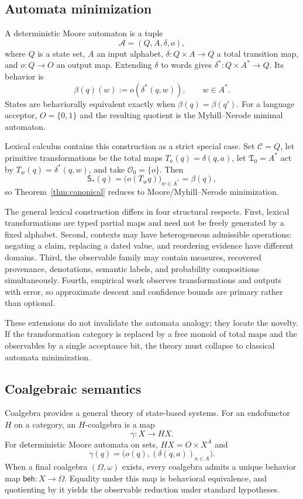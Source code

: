 \documentclass[11pt]{article}
\newcommand{\Ctxt}{\mathcal C}
\newcommand{\Trans}{\mathfrak T}
\begin{document}
{\subsection{Automata minimization}

A deterministic Moore automaton is a tuple
\[
 \mathcal A=(Q,A,\delta,o),
\]
where $Q$ is a state set, $A$ an input alphabet, $\delta:Q\times A\to Q$ a total transition map, and $o:Q\to O$ an output map. Extending $\delta$ to words gives $\delta^*:Q\times A^*\to Q$. Its behavior is
\[
 \beta(q)(w):=o(\delta^*(q,w)),\qquad w\in A^*.
\]
States are behaviorally equivalent exactly when $\beta(q)=\beta(q')$. For a language acceptor, $O=\{0,1\}$ and the resulting quotient is the Myhill--Nerode minimal automaton.

Lexical calculus contains this construction as a strict special case. Set $\Ctxt=Q$, let primitive transformations be the total maps $T_a(q)=\delta(q,a)$, let $\Trans_0=A^*$ act by $T_w(q)=\delta^*(q,w)$, and take $\mathcal O_0=\{o\}$. Then
\[
 \mathsf S_*(q)=\bigl(o(T_wq)\bigr)_{w\in A^*}=\beta(q),
\]
so Theorem~\ref{thm:canonical} reduces to Moore/Myhill--Nerode minimization.

The general lexical construction differs in four structural respects. First, lexical transformations are typed partial maps and need not be freely generated by a fixed alphabet. Second, contexts may have heterogeneous admissible operations: negating a claim, replacing a dated value, and reordering evidence have different domains. Third, the observable family may contain measures, recovered provenance, denotations, semantic labels, and probability compositions simultaneously. Fourth, empirical work observes transformations and outputs with error, so approximate descent and confidence bounds are primary rather than optional.

These extensions do not invalidate the automata analogy; they locate the novelty. If the transformation category is replaced by a free monoid of total maps and the observables by a single acceptance bit, the theory must collapse to classical automata minimization.

\subsection{Coalgebraic semantics}

Coalgebra provides a general theory of state-based systems. For an endofunctor $H$ on a category, an $H$-coalgebra is a map
\[
 \gamma:X\longrightarrow H X.
\]
For deterministic Moore automata on sets, $H X=O\times X^A$ and
\[
 \gamma(q)=\bigl(o(q),(\delta(q,a))_{a\in A}\bigr).
\]
When a final coalgebra $(\Omega,\omega)$ exists, every coalgebra admits a unique behavior map $\mathsf{beh}:X\to\Omega$. Equality under this map is behavioral equivalence, and quotienting by it yields the observable reduction under standard hypotheses.

}
\end{document}
